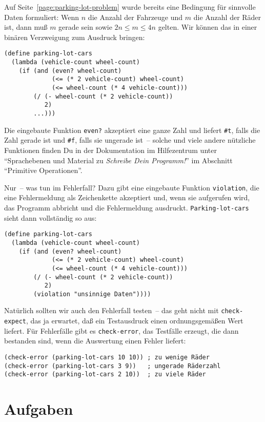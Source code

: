 Auf Seite~\ref{page:parking-lot-problem} wurde bereits eine Bedingung
für sinnvolle Daten formuliert: Wenn $n$ die Anzahl der Fahrzeuge und
$m$ die Anzahl der Räder ist, dann muß $m$ gerade sein sowie $2n\leq
m\leq 4n$ gelten.  Wir können das in einer binären Verzweigung zum
Ausdruck bringen:
%
\begin{verbatim}
(define parking-lot-cars
  (lambda (vehicle-count wheel-count)
    (if (and (even? wheel-count)
             (<= (* 2 vehicle-count) wheel-count)
             (<= wheel-count (* 4 vehicle-count)))
        (/ (- wheel-count (* 2 vehicle-count))
           2)
        ...)))
\end{verbatim}
%
Die eingebaute Funktion \texttt{even?} akzeptiert eine ganze Zahl und
liefert \verb|#t|, falls die Zahl gerade ist und \verb|#f|, falls sie
ungerade ist~-- solche und viele andere nützliche Funktionen finden
Du in der Dokumentation im Hilfezentrum unter "`Sprachebenen und
Material zu \textit{Schreibe Dein Programm!}"' im Abschnitt
"`Primitive Operationen"'.

Nur~-- was tun im Fehlerfall?  Dazu gibt eine eingebaute Funktion
\texttt{violation}, die eine Fehlermeldung als Zeichenkette akzeptiert
und, wenn sie aufgerufen wird, das Programm abbricht und die
Fehlermeldung ausdruckt.  \texttt{Parking-lot-cars} sieht dann
vollständig so aus:
%
\begin{verbatim}
(define parking-lot-cars
  (lambda (vehicle-count wheel-count)
    (if (and (even? wheel-count)
             (<= (* 2 vehicle-count) wheel-count)
             (<= wheel-count (* 4 vehicle-count)))
        (/ (- wheel-count (* 2 vehicle-count))
           2)
        (violation "unsinnige Daten"))))
\end{verbatim}
%
Natürlich sollten wir auch den Fehlerfall testen~-- das geht nicht mit
\texttt{check-expect}, das ja erwartet, daß ein Testausdruck einen
ordnungsgemäßen Wert liefert.  Für Fehlerfälle gibt es
\texttt{check-error}, das Testfälle erzeugt, die dann bestanden sind,
wenn die Auswertung einen Fehler liefert:
%
\begin{verbatim}
(check-error (parking-lot-cars 10 10)) ; zu wenige Räder
(check-error (parking-lot-cars 3 9))   ; ungerade Räderzahl
(check-error (parking-lot-cars 2 10))  ; zu viele Räder
\end{verbatim}

\section*{Aufgaben}

